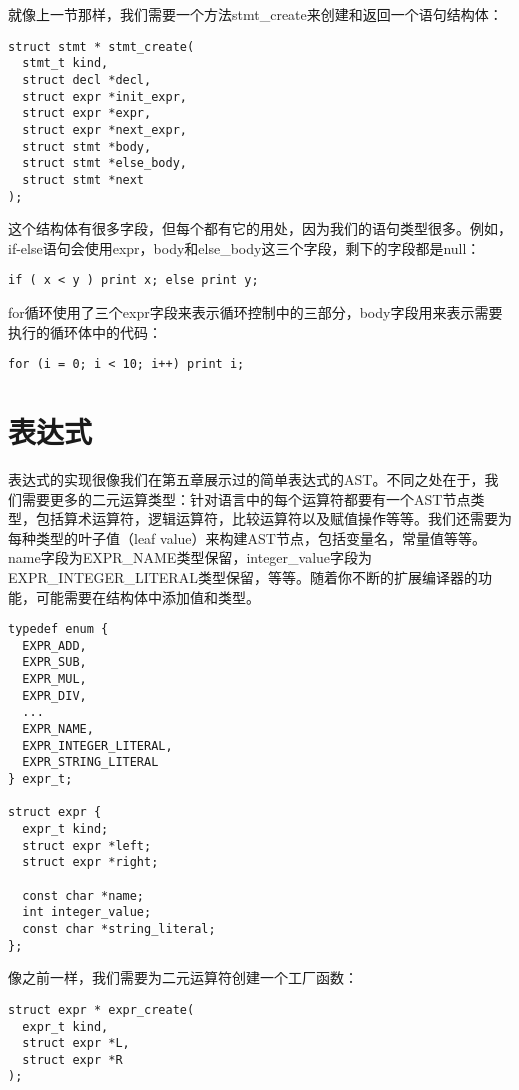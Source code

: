 \documentclass[cn,11pt,chinese]{elegantbook}
\begin{document}
就像上一节那样，我们需要一个方法stmt\_create来创建和返回一个语句结构体：

\begin{verbatim}
struct stmt * stmt_create(
  stmt_t kind,
  struct decl *decl,
  struct expr *init_expr,
  struct expr *expr,
  struct expr *next_expr,
  struct stmt *body,
  struct stmt *else_body,
  struct stmt *next
);
\end{verbatim}

这个结构体有很多字段，但每个都有它的用处，因为我们的语句类型很多。例如，if-else语句会使用expr，body和else\_body这三个字段，剩下的字段都是null：

\begin{verbatim}
if ( x < y ) print x; else print y;
\end{verbatim}

for循环使用了三个expr字段来表示循环控制中的三部分，body字段用来表示需要执行的循环体中的代码：

\begin{verbatim}
for (i = 0; i < 10; i++) print i;
\end{verbatim}

\section{表达式}

表达式的实现很像我们在第五章展示过的简单表达式的AST。不同之处在于，我们需要更多的二元运算类型：针对语言中的每个运算符都要有一个AST节点类型，包括算术运算符，逻辑运算符，比较运算符以及赋值操作等等。我们还需要为每种类型的叶子值（leaf value）来构建AST节点，包括变量名，常量值等等。name字段为EXPR\_NAME类型保留，integer\_value字段为EXPR\_INTEGER\_LITERAL类型保留，等等。随着你不断的扩展编译器的功能，可能需要在结构体中添加值和类型。

\begin{verbatim}
typedef enum {
  EXPR_ADD,
  EXPR_SUB,
  EXPR_MUL,
  EXPR_DIV,
  ...
  EXPR_NAME,
  EXPR_INTEGER_LITERAL,
  EXPR_STRING_LITERAL
} expr_t;

struct expr {
  expr_t kind;
  struct expr *left;
  struct expr *right;
  
  const char *name;
  int integer_value;
  const char *string_literal;
};
\end{verbatim}

像之前一样，我们需要为二元运算符创建一个工厂函数：

\begin{verbatim}
struct expr * expr_create(
  expr_t kind,
  struct expr *L,
  struct expr *R
);
\end{verbatim}
\end{document}
